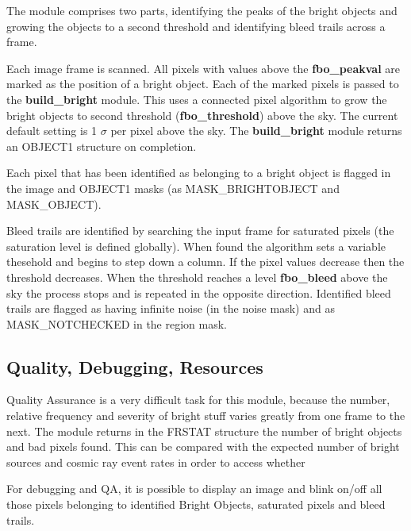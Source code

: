 The \bom module comprises two parts, identifying the peaks of the
bright objects and growing the objects to a second threshold and
identifying bleed trails across a frame.
 
Each image frame is scanned. All pixels with values above the
{\bf fbo\_peakval} are marked as the position of a bright object.
Each of the marked pixels is passed to the {\bf build\_bright}
module. This uses a connected pixel algorithm to grow the bright
objects to second threshold ({\bf fbo\_threshold}) above the sky. The
current default setting is 1 $\sigma$ per pixel above the sky. The {\bf
build\_bright} module returns an OBJECT1 structure on completion.
 
Each pixel that has been identified as belonging to a bright object is
flagged in the image and OBJECT1 masks (as MASK\_BRIGHTOBJECT and
MASK\_OBJECT).
 
Bleed trails are identified by searching the input frame for saturated
pixels (the saturation level is defined globally). When found the algorithm
sets a variable thesehold and begins to step down a column. If the pixel
values decrease then the threshold decreases. When the threshold reaches
a level {\bf fbo\_bleed} above the sky the process stops and is repeated    
in the opposite direction. Identified bleed trails are flagged as having 
infinite noise (in the noise mask) and as MASK\_NOTCHECKED in the region mask.
 
\subsection{Quality, Debugging, Resources}
 
Quality Assurance is a very difficult task for this module, because
the number, relative frequency and severity of bright stuff varies
greatly from one frame to the next. The module returns in the FRSTAT
structure the number of bright objects and bad pixels found. This can
be compared with the expected number of bright sources and cosmic ray
event rates in order to access whether 
 
For debugging and QA, it is possible to
display an image and blink on/off all those pixels
belonging to identified Bright Objects, saturated pixels and bleed
trails.
